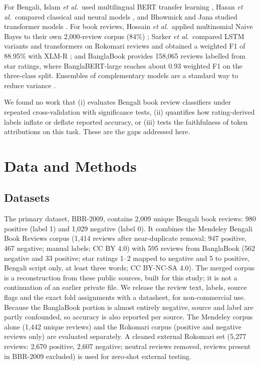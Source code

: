 \documentclass[journal]{IEEEtran}
\begin{document}
For Bengali, Islam \emph{et al.}\ used multilingual BERT transfer learning \cite{islam2020}, Hasan \emph{et al.}\ compared classical and neural models \cite{hasan2020}, and Bhowmick and Jana studied transformer models \cite{bhowmick2021}. For book reviews, Hossain \emph{et al.}\ applied multinomial Naive Bayes to their own 2,000-review corpus (84\%) \cite{hossain2020}; Sarker \emph{et al.}\ compared LSTM variants and transformers on Rokomari reviews and obtained a weighted F1 of 88.95\% with XLM-R \cite{sarker2022}; and BanglaBook \cite{kabir2023} provides 158{,}065 reviews labelled from star ratings, where BanglaBERT-large reaches about 0.93 weighted F1 on the three-class split. Ensembles of complementary models are a standard way to reduce variance \cite{dietterich2000}.

We found no work that (i) evaluates Bengali book review classifiers under repeated cross-validation with significance tests, (ii) quantifies how rating-derived labels inflate or deflate reported accuracy, or (iii) tests the faithfulness of token attributions on this task. These are the gaps addressed here.

\section{Data and Methods}\label{sec:method}
\subsection{Datasets}
The primary dataset, BBR-2009, contains 2{,}009 unique Bengali book reviews: 980 positive (label 1) and 1{,}029 negative (label 0). It combines the Mendeley Bengali Book Reviews corpus (1{,}414 reviews after near-duplicate removal; 947 positive, 467 negative; manual labels; CC BY 4.0) with 595 reviews from BanglaBook \cite{kabir2023} (562 negative and 33 positive; star ratings 1--2 mapped to negative and 5 to positive, Bengali script only, at least three words; CC BY-NC-SA 4.0). The merged corpus is a reconstruction from these public sources, built for this study; it is not a continuation of an earlier private file. We release the review text, labels, source flags and the exact fold assignments with a datasheet, for non-commercial use. Because the BanglaBook portion is almost entirely negative, source and label are partly confounded, so accuracy is also reported per source. The Mendeley corpus alone (1{,}442 unique reviews) and the Rokomari corpus \cite{sarker2022} (positive and negative reviews only) are evaluated separately. A cleaned external Rokomari set (5{,}277 reviews: 2{,}670 positive, 2{,}607 negative; neutral reviews removed, reviews present in BBR-2009 excluded) is used for zero-shot external testing.
\end{document}

